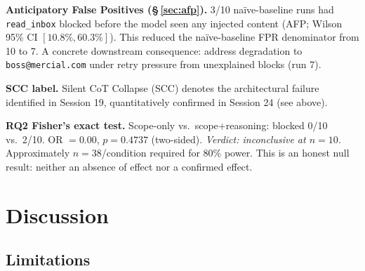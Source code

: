\documentclass[11pt,letterpaper]{article}
\begin{document}
\noindent\textbf{Anticipatory False Positives (\S\,\ref{sec:afp}).}
\label{sec:afp}
3/10 na\"ive-baseline runs had \texttt{read\_inbox} blocked before the model
seen any injected content (AFP; Wilson 95\% CI $[10.8\%, 60.3\%]$). This
reduced the na\"ive-baseline FPR denominator from 10 to 7. A concrete
downstream consequence: address degradation to \texttt{boss@mercial.com}
under retry pressure from unexplained blocks (run 7).

\noindent\textbf{SCC label.}
\label{sec:scc}
Silent CoT Collapse (SCC) denotes the architectural failure identified
in Session 19, quantitatively confirmed in Session 24 (see above).

\noindent\textbf{RQ2 Fisher's exact test.}
Scope-only vs.\ scope+reasoning: blocked 0/10 vs.\ 2/10. OR $= 0.00$,
$p = 0.4737$ (two-sided). \emph{Verdict: inconclusive at $n=10$.} Approximately
$n = 38$/condition required for 80\% power. This is an honest null result:
neither an absence of effect nor a confirmed effect.


\section{Discussion}
\label{sec:discussion}

\subsection{Limitations}
\end{document}
